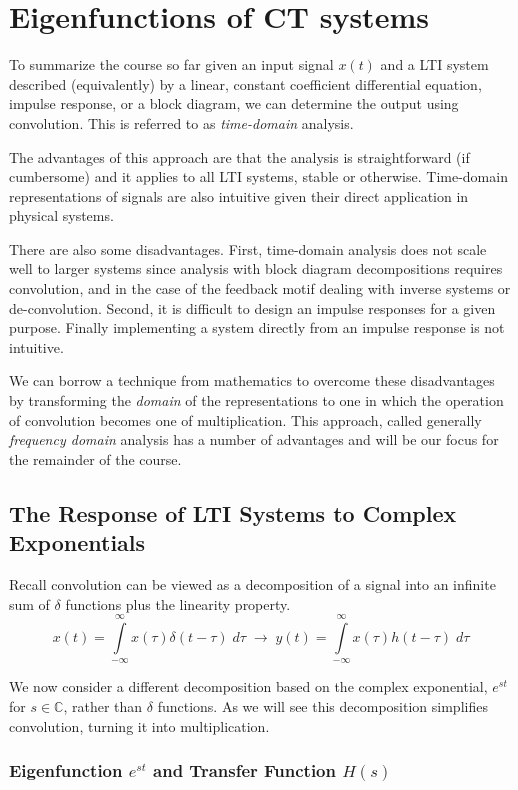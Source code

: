 \section{Eigenfunctions of CT systems}
To summarize the course so far given an input signal $x(t)$ and a LTI system described (equivalently) by a linear, constant coefficient differential equation, impulse response, or a block diagram, we can determine the output using convolution. This is referred to as \emph{time-domain} analysis.

The advantages of this approach are that the analysis is straightforward (if cumbersome) and it applies to all LTI systems, stable or otherwise. Time-domain representations of signals are also intuitive given their direct application in physical systems.

There are also some disadvantages. First, time-domain analysis does not scale well to larger systems since analysis with block diagram decompositions requires convolution, and in the case of the feedback motif dealing with inverse systems or de-convolution. Second, it is difficult to design an impulse responses for a given purpose. Finally implementing a system directly from an impulse response is not intuitive.

We can borrow a technique from mathematics to overcome these disadvantages by transforming the \emph{domain} of the representations to one in which the operation of convolution becomes one of multiplication. This approach, called generally \emph{frequency domain} analysis has a number of advantages and will be our focus for the remainder of the course.

\subsection{The Response of LTI Systems to Complex Exponentials}

Recall convolution can be viewed as a decomposition of a signal into an infinite sum of $\delta$ functions plus the linearity property.
\[
x(t) = \int\limits_{-\infty}^{\infty} x(\tau)\delta(t-\tau) \; d\tau \;\longrightarrow\; y(t) = \int\limits_{-\infty}^{\infty} x(\tau)h(t-\tau) \; d\tau
\]
  
We now consider a different decomposition based on the complex exponential, $e^{st}$ for $s \in \mathbb{C}$, rather than $\delta$ functions. As we will see this decomposition simplifies convolution, turning it into multiplication.

\subsubsection{Eigenfunction $e^{st}$ and Transfer Function $H(s)$}

